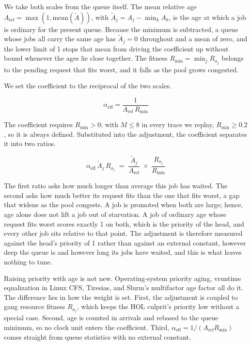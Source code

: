 \documentclass{ieeetj}
\begin{document}
We take both scales from the queue itself. The mean relative age $A_{\text{ref}} = \max(1,\text{mean}(\tilde A))$, with $\tilde A_j = A_j - \min_k A_k$, is the age at which a job is ordinary for the present queue. Because the minimum is subtracted, a queue whose jobs all carry the same age has $\tilde A_j=0$ throughout and a mean of zero, and the lower limit of 1 stops that mean from driving the coefficient up without bound whenever the ages lie close together. The fitness $R_{\min}=\min_j R_{a_j}$ belongs to the pending request that fits worst, and it falls as the pool grows congested.

We set the coefficient to the reciprocal of the two scales.

\begin{equation}
\alpha_{\text{eff}} = \frac{1}{A_{\text{ref}}\,R_{\min}}
\label{eq:auto-alpha}
\end{equation}

The coefficient requires $R_{\min}>0$; with $M\le8$ in every trace we replay, $R_{\min}\ge0.2$, so it is always defined. Substituted into the adjustment, the coefficient separates it into two ratios.

\begin{equation}
\alpha_{\text{eff}}\,\tilde A_j\, R_{a_j} \;=\; \frac{\tilde A_j}{A_{\text{ref}}} \;\times\; \frac{R_{a_j}}{R_{\min}}
\label{eq:alphaeff-define}
\end{equation}

The first ratio asks how much longer than average this job has waited. The second asks how much better its request fits than the one that fits worst, a gap that widens as the pool congests. A job is promoted when both are large; hence, age alone does not lift a job out of starvation. A job of ordinary age whose request fits worst scores exactly 1 on both, which is the priority of the head, and every other job sits relative to that point. The adjustment is therefore measured against the head's priority of 1 rather than against an external constant, however deep the queue is and however long its jobs have waited, and this is what leaves nothing to tune.

Raising priority with age is not new. Operating-system priority aging, vruntime equalization in Linux CFS, Tiresias\cite{gu2019tiresias}, and Slurm's multifactor age factor all do it. The difference lies in how the weight is set. First, the adjustment is coupled to gang resource fitness $R_{a_j}$, which keeps the HOL culprit's priority low without a special case. Second, age is counted in arrivals and rebased to the queue minimum, so no clock unit enters the coefficient. Third, $\alpha_{\text{eff}}=1/(A_{\text{ref}}R_{\min})$ comes straight from queue statistics with no external constant.
\end{document}
